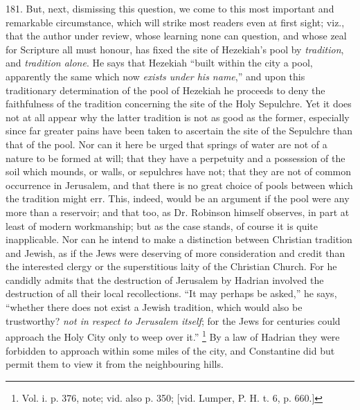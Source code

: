 181.
But, next, dismissing this question, we come to this most important
and remarkable circumstance, which will strike most readers even at
first sight; viz., that the author under review, whose learning none
can question, and whose zeal for Scripture all must honour, has fixed
the site of Hezekiah's pool by \emph{tradition}, and \emph{tradition
alone}. He says that Hezekiah ``built within the city a pool,
apparently the same which now \emph{exists under his name},'' and upon
this traditionary determination of the pool of Hezekiah he proceeds to
deny the faithfulness of the tradition concerning the site of the Holy
Sepulchre. Yet it does not at all appear why the latter tradition is
not as good as the former, especially since far greater pains have
been taken to ascertain the site of the Sepulchre than that of the
pool. Nor can it here be urged that springs of water are not of a
nature to be formed at will; that they have a perpetuity and a
possession of the soil which mounds, or walls, or sepulchres have not;
that they are not of common occurrence in Jerusalem, and that there is
no great choice of pools between which the tradition might err. This,
indeed, would be an argument if the pool were any more than a
reservoir; and that too, as Dr. Robinson himself observes, in part at
least of modern workmanship; but as the case stands, of course it is
quite inapplicable. Nor can he intend to make a distinction between
Christian tradition and Jewish, as if the Jews were deserving of more
consideration and credit than the interested clergy or the
superstitious laity of the Christian Church. For he candidly admits
that the destruction of Jerusalem by Hadrian involved the destruction
of all their local recollections. ``It may perhaps be asked,'' he says, ``whether
there does not exist a Jewish tradition, which would also be
trustworthy? \emph{not in respect to Jerusalem itself}; for the
Jews for centuries could approach the Holy City only to weep over it.''
\footnote{Vol. i. p. 376, note; vid. also p. 350; [vid. Lumper, P. H. t. 6, p.
660.]} By a law of Hadrian
they were forbidden to approach within some miles of the city, and
Constantine did but permit them to view it from the neighbouring
hills.

